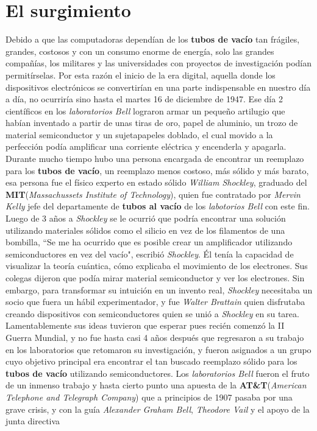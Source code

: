 \section*{El surgimiento}
Debido a que las computadoras dependían de los \textbf{tubos de vacío} tan frágiles, grandes, costosos y con un consumo enorme de energía, solo las grandes 
compañías, los militares y las universidades con proyectos de investigación podían permitírselas. Por esta razón el inicio de la era digital, aquella donde 
los dispositivos electrónicos se convertirían en una parte indispensable en nuestro día a día, no ocurriría sino hasta el martes 16 de diciembre de 1947. Ese 
día 2 científicos en los \emph{laboratorios Bell} lograron armar un pequeño artilugio que habían inventado a partir de unas tiras de oro, papel de aluminio,
un trozo de material semiconductor y un sujetapapeles doblado, el cual movido a la perfección podía amplificar una corriente eléctrica y encenderla y apagarla.\\
Durante mucho tiempo hubo una persona encargada de encontrar un reemplazo para los \textbf{tubos de vacío}, un reemplazo menos costoso, más sólido y más barato, esa 
persona fue el físico experto en estado sólido \emph{William Shockley}, graduado del \textbf{MIT}(\emph{Massachussets Institute of Technology}), quien fue contratado 
por \emph{Mervin Kelly} jefe del departamente de \textbf{tubos al vacío} de los \emph{labotorios Bell} con este fin. Luego de 3 años a \emph{Shockley} se le ocurrió que 
podría encontrar una solución utilizando materiales sólidos como el silicio en vez de los filamentos de una bombilla, “Se me ha ocurrido que es posible crear un amplificador 
utilizando semiconductores en vez del vacío", escribió \emph{Shockley}. Él tenía la capacidad de visualizar la teoría cuántica, cómo explicaba el movimiento de los
electrones. Sus colegas dijeron que podía mirar material semiconductor y ver los electrones. Sin embargo, para transformar su intuición en un invento real, \emph{Shockley}
necesitaba un socio que fuera un hábil experimentador, y fue \emph{Walter Brattain} quien disfrutaba creando dispositivos con semiconductores quien se unió a \emph{Shockley} en su tarea. 
Lamentablemente sus ideas tuvieron que esperar pues recién comenzó la II Guerra Mundial, y no fue hasta casi 4 años después que regresaron a su trabajo en los laboratorios 
que retomaron su investigación, y fueron asignados a un grupo cuyo objetivo principal era encontrar el tan buscado reemplazo sólido para los \textbf{tubos de vacío} utilizando 
semiconductores.
Los \emph{laboratorios Bell} fueron el fruto de un inmenso trabajo y hasta cierto punto una apuesta de la \textbf{AT\&T}(\emph{American Telephone and Telegraph 
Company}) que a principios de 1907 pasaba por una grave crisis, y con la guía \emph{Alexander Graham Bell}, \emph{Theodore Vail} y el apoyo de la junta directiva
